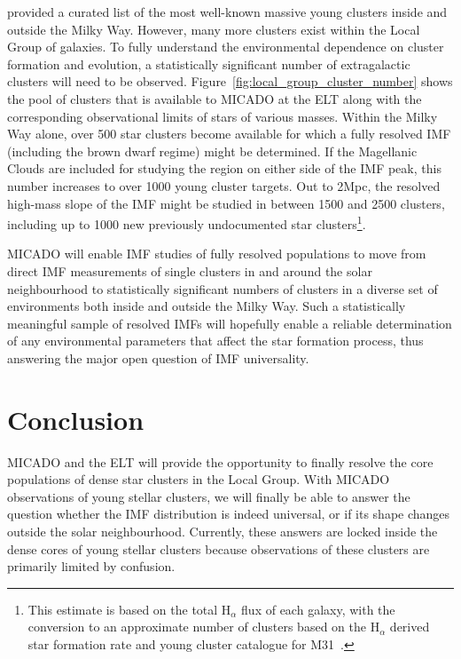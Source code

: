 \documentclass{aa}
\begin{document}
\citet{portegies2010} provided a curated list of the most well-known massive young clusters inside and outside the Milky Way.
However, many more clusters exist within the Local Group of galaxies.
To fully understand the environmental dependence on cluster formation and evolution, a statistically significant number of extragalactic clusters will need to be observed.
Figure~\ref{fig:local_group_cluster_number} shows the pool of clusters that is available to MICADO at the ELT along with the corresponding observational limits of stars of various masses.
Within the Milky Way alone, over 500 star clusters become available for which a fully resolved IMF (including the brown dwarf regime) might be determined.
If the Magellanic Clouds are included for studying the region on either side of the IMF peak, this number increases to over 1000 young cluster targets.
Out to 2Mpc, the resolved high-mass slope of the IMF might be studied in between 1500 and 2500 clusters, including up to 1000 new previously undocumented star clusters\footnote{This estimate is based on the total H$_\alpha$ flux of each galaxy, with the conversion to an approximate number of clusters based on the H$_\alpha$ derived star formation rate and young cluster catalogue for M31~\citep{caldwell09}.}.

MICADO will enable IMF studies of fully resolved populations to move from direct IMF measurements of single clusters in and around the solar neighbourhood to statistically significant numbers of clusters in a diverse set of environments both inside and outside the Milky Way.
Such a statistically meaningful sample of resolved IMFs will hopefully enable a reliable determination of any environmental parameters that affect the star formation process, thus answering the major open question of IMF universality.




\section{Conclusion}
\label{sec:conclusion}

MICADO and the ELT will provide the opportunity to finally resolve the core populations of dense star clusters in the Local Group.
With MICADO observations of young stellar clusters, we will finally be able to answer the question whether the IMF distribution is indeed universal, or if its shape changes outside the solar neighbourhood.
Currently, these answers are locked inside the dense cores of young stellar clusters because observations of these clusters are primarily limited by confusion.
\end{document}
